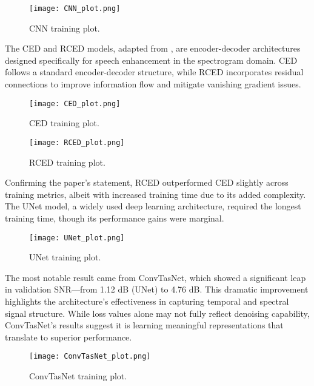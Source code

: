 \begin{figure}[H]
    \centering
    \texttt{[image: CNN\_plot.png]}
    \caption{\label{fig:cnn_training_plot} CNN training plot.}
\end{figure}

The CED and RCED models, adapted from \cite{park2017acoustic}, are encoder-decoder architectures designed specifically for speech enhancement in the spectrogram domain. CED follows a standard encoder-decoder structure, while RCED incorporates residual connections to improve information flow and mitigate vanishing gradient issues.

\begin{figure}[H]
    \centering
    \texttt{[image: CED\_plot.png]}
    \caption{\label{fig:ced_training_plot} CED training plot.}
\end{figure}

\begin{figure}[H]
    \centering
    \texttt{[image: RCED\_plot.png]}
    \caption{\label{fig:rced_training_plot} RCED training plot.}
\end{figure}

Confirming the paper’s statement, RCED outperformed CED slightly across training metrics, albeit with increased training time due to its added complexity. The UNet model, a widely used deep learning architecture, required the longest training time, though its performance gains were marginal.

\begin{figure}[H]
    \centering
    \texttt{[image: UNet\_plot.png]}
    \caption{\label{fig:unet_training_plot} UNet training plot.}
\end{figure}

The most notable result came from ConvTasNet, which showed a significant leap in validation SNR—from 1.12 dB (UNet) to 4.76 dB. This dramatic improvement highlights the architecture’s effectiveness in capturing temporal and spectral signal structure. While loss values alone may not fully reflect denoising capability, ConvTasNet’s results suggest it is learning meaningful representations that translate to superior performance.

\begin{figure}[H]
    \centering
    \texttt{[image: ConvTasNet\_plot.png]}
    \caption{\label{fig:convtasnet_training_plot} ConvTasNet training plot.}
\end{figure}

